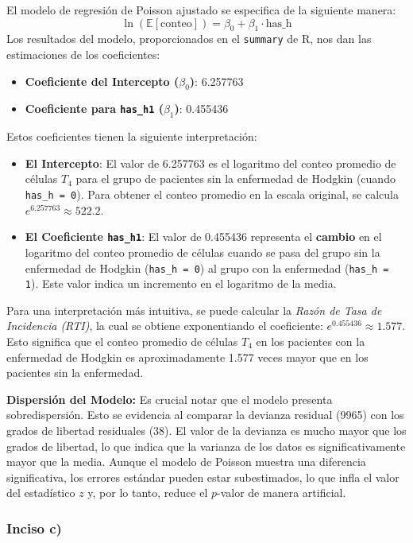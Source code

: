 \documentclass[paper=letter, fontsize=11pt]{scrartcl}\usepackage[]{graphicx}\usepackage[]{xcolor}
\numberwithin{equation}{problemcounter} %
\numberwithin{figure}{problemcounter} %
\numberwithin{table}{problemcounter} %
\numberwithin{subsection}{problemcounter}
\begin{document}
El modelo de regresión de Poisson ajustado se especifica de la siguiente manera:
$$
\ln(\mathbb{E}[\text{conteo}]) = \beta_0 + \beta_1 \cdot \text{has\_h}
$$
Los resultados del modelo, proporcionados en el \texttt{summary} de R, nos dan las estimaciones de los coeficientes:
\begin{itemize}
    \item \textbf{Coeficiente del Intercepto ($\beta_0$)}: 6.257763
    \item \textbf{Coeficiente para \texttt{has\_h1} ($\beta_1$)}: 0.455436
\end{itemize}
Estos coeficientes tienen la siguiente interpretación:
\begin{itemize}
    \item \textbf{El Intercepto}: El valor de 6.257763 es el logaritmo del conteo promedio de células $T_4$ para el grupo de pacientes sin la enfermedad de Hodgkin (cuando \texttt{has\_h = 0}). Para obtener el conteo promedio en la escala original, se calcula $e^{6.257763} \approx 522.2$.
    \item \textbf{El Coeficiente \texttt{has\_h1}}: El valor de 0.455436 representa el \textbf{cambio} en el logaritmo del conteo promedio de células cuando se pasa del grupo sin la enfermedad de Hodgkin (\texttt{has\_h = 0}) al grupo con la enfermedad (\texttt{has\_h = 1}). Este valor indica un incremento en el logaritmo de la media.
\end{itemize}
Para una interpretación más intuitiva, se puede calcular la \textit{Razón de Tasa de Incidencia (RTI)}, la cual se obtiene exponentiando el coeficiente: $e^{0.455436} \approx 1.577$. Esto significa que el conteo promedio de células $T_4$ en los pacientes con la enfermedad de Hodgkin es aproximadamente 1.577 veces mayor que en los pacientes sin la enfermedad.

\noindent\textbf{Dispersión del Modelo:}
Es crucial notar que el modelo presenta sobredispersión. Esto se evidencia al comparar la devianza residual (9965) con los grados de libertad residuales (38). El valor de la devianza es mucho mayor que los grados de libertad, lo que indica que la varianza de los datos es significativamente mayor que la media.
Aunque el modelo de Poisson muestra una diferencia significativa, los errores estándar pueden estar subestimados, lo que infla el valor del estadístico $z$ y, por lo tanto, reduce el $p$-valor de manera artificial. 

\subsubsection*{Inciso c)}
\end{document}
